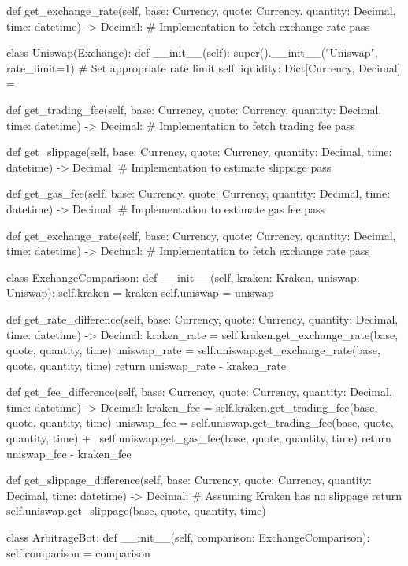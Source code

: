     def get_exchange_rate(self, base: Currency, quote: Currency, quantity: Decimal, time: datetime) -> Decimal:
        # Implementation to fetch exchange rate
        pass

class Uniswap(Exchange):
    def __init__(self):
        super().__init__("Uniswap", rate_limit=1)  # Set appropriate rate limit
        self.liquidity: Dict[Currency, Decimal] = {}
        
    def get_trading_fee(self, base: Currency, quote: Currency, quantity: Decimal, time: datetime) -> Decimal:
        # Implementation to fetch trading fee
        pass

    def get_slippage(self, base: Currency, quote: Currency, quantity: Decimal, time: datetime) -> Decimal:
        # Implementation to estimate slippage
        pass

    def get_gas_fee(self, base: Currency, quote: Currency, quantity: Decimal, time: datetime) -> Decimal:
        # Implementation to estimate gas fee
        pass

    def get_exchange_rate(self, base: Currency, quote: Currency, quantity: Decimal, time: datetime) -> Decimal:
        # Implementation to fetch exchange rate
        pass

class ExchangeComparison:
    def __init__(self, kraken: Kraken, uniswap: Uniswap):
        self.kraken = kraken
        self.uniswap = uniswap

    def get_rate_difference(self, base: Currency, quote: Currency, quantity: Decimal, time: datetime) -> Decimal:
        kraken_rate = self.kraken.get_exchange_rate(base, quote, quantity, time)
        uniswap_rate = self.uniswap.get_exchange_rate(base, quote, quantity, time)
        return uniswap_rate - kraken_rate

    def get_fee_difference(self, base: Currency, quote: Currency, quantity: Decimal, time: datetime) -> Decimal:
        kraken_fee = self.kraken.get_trading_fee(base, quote, quantity, time)
        uniswap_fee = self.uniswap.get_trading_fee(base, quote, quantity, time) + \
                      self.uniswap.get_gas_fee(base, quote, quantity, time)
        return uniswap_fee - kraken_fee

    def get_slippage_difference(self, base: Currency, quote: Currency, quantity: Decimal, time: datetime) -> Decimal:
        # Assuming Kraken has no slippage
        return self.uniswap.get_slippage(base, quote, quantity, time)

class ArbitrageBot:
    def __init__(self, comparison: ExchangeComparison):
        self.comparison = comparison

